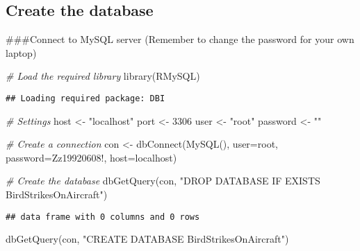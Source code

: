\documentclass[
]{article}
\newenvironment{Shaded}{\begin{snugshade}}{\end{snugshade}}
\newcommand{\AttributeTok}[1]{\textcolor[rgb]{0.77,0.63,0.00}{#1}}
\newcommand{\CommentTok}[1]{\textcolor[rgb]{0.56,0.35,0.01}{\textit{#1}}}
\newcommand{\DecValTok}[1]{\textcolor[rgb]{0.00,0.00,0.81}{#1}}
\newcommand{\FunctionTok}[1]{\textcolor[rgb]{0.00,0.00,0.00}{#1}}
\newcommand{\NormalTok}[1]{#1}
\newcommand{\OtherTok}[1]{\textcolor[rgb]{0.56,0.35,0.01}{#1}}
\newcommand{\StringTok}[1]{\textcolor[rgb]{0.31,0.60,0.02}{#1}}
\begin{document}
\hypertarget{create-the-database}{%
\subsection{Create the database}\label{create-the-database}}

\#\#\#Connect to MySQL server (Remember to change the password for your
own laptop)

\begin{Shaded}
\begin{Highlighting}[]
\CommentTok{\# Load the required library}
\FunctionTok{library}\NormalTok{(RMySQL)}
\end{Highlighting}
\end{Shaded}

\begin{verbatim}
## Loading required package: DBI
\end{verbatim}

\begin{Shaded}
\begin{Highlighting}[]
\CommentTok{\# Settings}
\NormalTok{host }\OtherTok{\textless{}{-}} \StringTok{"localhost"}
\NormalTok{port }\OtherTok{\textless{}{-}} \DecValTok{3306}
\NormalTok{user }\OtherTok{\textless{}{-}} \StringTok{"root"}
\NormalTok{password }\OtherTok{\textless{}{-}} \StringTok{""}

\CommentTok{\# Create a connection}
\NormalTok{con }\OtherTok{\textless{}{-}} \FunctionTok{dbConnect}\NormalTok{(}\FunctionTok{MySQL}\NormalTok{(), }\AttributeTok{user=}\StringTok{\textquotesingle{}root\textquotesingle{}}\NormalTok{, }
                 \AttributeTok{password=}\StringTok{\textquotesingle{}Zz19920608!\textquotesingle{}}\NormalTok{, }\AttributeTok{host=}\StringTok{\textquotesingle{}localhost\textquotesingle{}}\NormalTok{)}

\CommentTok{\# Create the database}
\FunctionTok{dbGetQuery}\NormalTok{(con, }\StringTok{"DROP DATABASE IF EXISTS BirdStrikesOnAircraft"}\NormalTok{)}
\end{Highlighting}
\end{Shaded}

\begin{verbatim}
## data frame with 0 columns and 0 rows
\end{verbatim}

\begin{Shaded}
\begin{Highlighting}[]
\FunctionTok{dbGetQuery}\NormalTok{(con, }\StringTok{"CREATE DATABASE BirdStrikesOnAircraft"}\NormalTok{)}
\end{Highlighting}
\end{Shaded}
\end{document}
